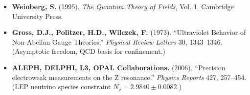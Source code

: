 \documentclass[12pt]{article}
\begin{document}
\begin{itemize}
{  Values of the Fundamental Physical Constants.} NIST.
\item
  \textbf{Weinberg, S.} (1995). \emph{The Quantum Theory of Fields},
  Vol. 1. Cambridge University Press.
\item
  \textbf{Gross, D.J., Politzer, H.D., Wilczek, F.} (1973).
  ``Ultraviolet Behavior of Non-Abelian Gauge Theories.'' \emph{Physical
  Review Letters} 30, 1343--1346. (Asymptotic freedom, QCD basis for
  confinement.)
\item
  \textbf{ALEPH, DELPHI, L3, OPAL Collaborations.} (2006). ``Precision
  electroweak measurements on the Z resonance.'' \emph{Physics Reports}
  427, 257--454. (LEP neutrino species constraint
  \(N_\nu = 2.9840 \pm 0.0082\).)
\end{itemize}
\end{document}
